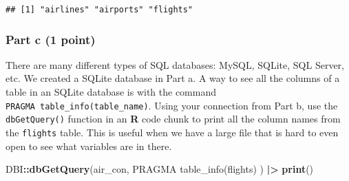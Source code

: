 \documentclass[
]{article}
\newenvironment{Shaded}{\begin{snugshade}}{\end{snugshade}}
\newcommand{\FunctionTok}[1]{\textcolor[rgb]{0.13,0.29,0.53}{\textbf{#1}}}
\newcommand{\NormalTok}[1]{#1}
\newcommand{\SpecialCharTok}[1]{\textcolor[rgb]{0.81,0.36,0.00}{\textbf{#1}}}
\newcommand{\StringTok}[1]{\textcolor[rgb]{0.31,0.60,0.02}{#1}}
\begin{document}
\begin{verbatim}
## [1] "airlines" "airports" "flights"
\end{verbatim}

\hypertarget{part-c-1-point}{%
\subsubsection{Part c (1 point)}\label{part-c-1-point}}

There are many different types of SQL databases: MySQL, SQLite, SQL
Server, etc. We created a SQLite database in Part a. A way to see all
the columns of a table in an SQLite database is with the command
\texttt{PRAGMA\ table\_info(\textquotesingle{}table\_name\textquotesingle{})}.
Using your connection from Part b, use the \texttt{dbGetQuery()}
function in an \textbf{R} code chunk to print all the column names from
the \texttt{flights} table. This is useful when we have a large file
that is hard to even open to see what variables are in there.

\begin{Shaded}
\begin{Highlighting}[]
\NormalTok{DBI}\SpecialCharTok{::}\FunctionTok{dbGetQuery}\NormalTok{(air\_con, }\StringTok{\textquotesingle{}PRAGMA table\_info(flights) \textquotesingle{}}\NormalTok{) }\SpecialCharTok{|\textgreater{}} \FunctionTok{print}\NormalTok{()}
\end{Highlighting}
\end{Shaded}
\end{document}
